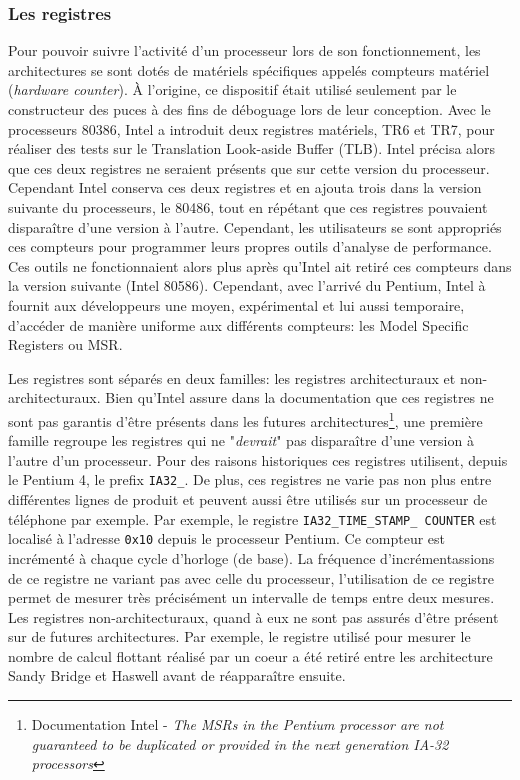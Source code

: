     

    \subsubsection{Les registres}
    
        Pour pouvoir suivre l'activité d'un processeur lors de son fonctionnement, les architectures se sont dotés de matériels spécifiques appelés compteurs matériel (\textit{hardware counter}). À l'origine, ce dispositif était utilisé seulement par le constructeur des puces à des fins de déboguage lors de leur conception. Avec le processeurs 80386, Intel a introduit deux registres matériels, TR6 et TR7, pour réaliser des tests sur le Translation Look-aside Buffer (TLB). Intel précisa alors que ces deux registres ne seraient présents que sur cette version du processeur. Cependant Intel conserva ces deux registres et en ajouta trois dans la version suivante du processeurs, le 80486, tout en répétant que ces registres pouvaient disparaître d’une version à l’autre. Cependant, les utilisateurs se sont appropriés ces compteurs pour programmer leurs propres outils d'analyse de performance. Ces outils ne fonctionnaient alors plus après qu'Intel ait retiré ces compteurs dans la version suivante (Intel 80586). Cependant, avec l’arrivé du Pentium, Intel à fournit aux développeurs une moyen, expérimental et lui aussi temporaire, d’accéder de manière uniforme aux différents compteurs: les Model Specific Registers ou MSR.

        Les registres sont séparés en deux familles: les registres architecturaux et non-architecturaux. Bien qu'Intel assure dans la documentation que ces registres ne sont pas garantis d'être présents dans les futures architectures\footnote{Documentation Intel - \textit{The MSRs in the Pentium processor are not guaranteed to be duplicated or provided in the next generation IA-32 processors}}, une première famille regroupe les registres qui ne "\textit{devrait}" pas disparaître d'une version à l'autre d'un processeur. Pour des raisons historiques ces registres utilisent, depuis le Pentium 4, le prefix \verb|IA32_|. De plus, ces registres ne varie pas non plus entre différentes lignes de produit et peuvent aussi être utilisés sur un processeur de téléphone par exemple. Par exemple, le registre \verb|IA32_TIME_STAMP_ COUNTER| est localisé à l'adresse \verb|0x10| depuis le processeur Pentium. Ce compteur est incrémenté à chaque cycle d'horloge (de base). La fréquence d'incrémentassions de ce registre ne variant pas avec celle du processeur, l'utilisation de ce registre permet de mesurer très précisément un intervalle de temps entre deux mesures. 
        Les registres non-architecturaux, quand à eux ne sont pas assurés d'être présent sur de futures architectures. Par exemple, le registre utilisé pour mesurer le nombre de calcul flottant réalisé par un coeur a été retiré entre les architecture Sandy Bridge et Haswell avant de réapparaître ensuite. 
    
